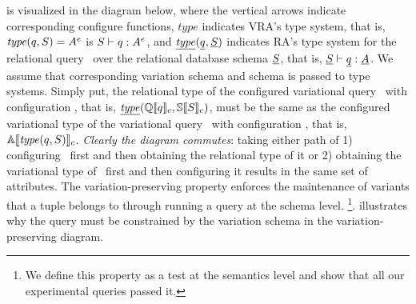 %
\begin{wrapfigure}{r}{0.24\textwidth}
\begin{center}
\end{center}
\end{wrapfigure}
%
 is visualized in the diagram below, where 
the vertical arrows indicate corresponding configure functions,
\ensuremath{\mathit{type}} indicates VRA's type system, 
that is, \ensuremath{\mathit{type}(\vQ, \vSch) = \annot \vAttList} is 
\ensuremath{\envWithoutVctx \vQ {\envInContext [ \vctx] \vType}},
and
\ensuremath{\underline{\mathit{type}} (\pQ, \underline {\vSch})} indicates RA's type system
for the relational query \pQ\ over the relational database schema $\underline {\vSch}$,
that is, \ensuremath{\pEnv {\pQ} {\pAttList}}.
We assume that corresponding variation schema and schema is
passed to type systems.
Simply put, 
the relational type of the configured variational query \vQ\ with configuration \config, 
that is, \ensuremath{\underline {\mathit{type}} (\eeSem {\vQ}, \osSem \vSch)},
must be the same as the configured variational type 
of the variational query \vQ\ with configuration \config, 
that is, \ensuremath{\olSem {\mathit{type} (\vQ, \vSch)}}.
\emph{Clearly the diagram commutes}: taking either path of 1) configuring \constrain \vQ\ first and 
then obtaining the relational type of it or 
2) obtaining the variational type of \constrain \vQ\ first and then configuring it results
in the same set of attributes. 
The variation-preserving property enforces the maintenance of variants that a tuple
belongs to through running a query at the schema level.%
\footnote{
We define this property as a test at the semantics level and show that
all our experimental
queries passed it.}.
%
 illustrates why the query must be constrained by the variation schema
in the variation-preserving diagram.

